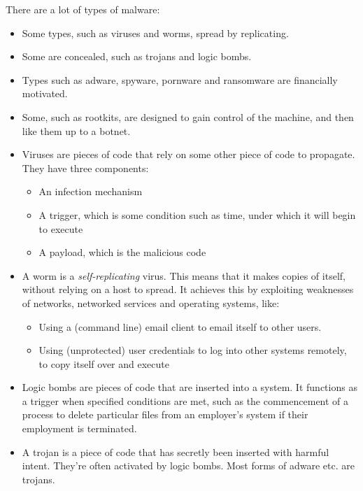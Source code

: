 \documentclass[11pt,a4paper,titlepage]{scrartcl}
\begin{document}
There are a lot of types of malware:
\begin{itemize}
    \item Some types, such as viruses and worms, spread by replicating.
    \item Some are concealed, such as trojans and logic bombs.
    \item Types such as adware, spyware, pornware and ransomware are
        financially motivated.
    \item Some, such as rootkits, are designed to gain control of the
        machine, and then like them up to a botnet.
    \item Viruses are pieces of code that rely on some other piece of code
        to propagate. They have three components:
        \begin{itemize}
            \item An infection mechanism
            \item A trigger, which is some condition such as time, under
                which it will begin to execute
            \item A payload, which is the malicious code
        \end{itemize}
    \item A worm is a \textit{self-replicating} virus. This means that
            it makes copies of itself, without relying on a host to
            spread. It achieves this by exploiting weaknesses of networks,
            networked services and operating systems, like:
    \begin{itemize}
        \item Using a (command line) email client to email itself to other
            users.
        \item Using (unprotected) user credentials to log into other
            systems remotely, to copy itself over and execute
    \end{itemize}
    \item Logic bombs are pieces of code that are inserted into a system.
        It functions as a trigger when specified conditions are met, such
        as the commencement of a process to delete particular files from
        an employer's system if their employment is terminated.
    \item A trojan is a piece of code that has secretly been inserted with
        harmful intent. They're often activated by logic bombs. Most forms
        of adware etc. are trojans.
\end{itemize}
\end{document}
